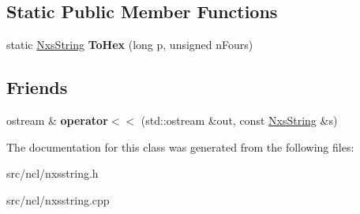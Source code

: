 \subsection*{Static Public Member Functions}
\begin{DoxyCompactItemize}
\item 
\hypertarget{classNxsString_ae1ea616b5c58b8efcf4d9310ae557dc4}{
static \hyperlink{classNxsString}{NxsString} {\bfseries ToHex} (long p, unsigned nFours)}
\label{classNxsString_ae1ea616b5c58b8efcf4d9310ae557dc4}

\end{DoxyCompactItemize}
\subsection*{Friends}
\begin{DoxyCompactItemize}
\item 
\hypertarget{classNxsString_a6a6a52802a6cd6fa55b079e03fe65042}{
ostream \& {\bfseries operator$<$$<$} (std::ostream \&out, const \hyperlink{classNxsString}{NxsString} \&s)}
\label{classNxsString_a6a6a52802a6cd6fa55b079e03fe65042}

\end{DoxyCompactItemize}


The documentation for this class was generated from the following files:\begin{DoxyCompactItemize}
\item 
src/ncl/nxsstring.h\item 
src/ncl/nxsstring.cpp\end{DoxyCompactItemize}
